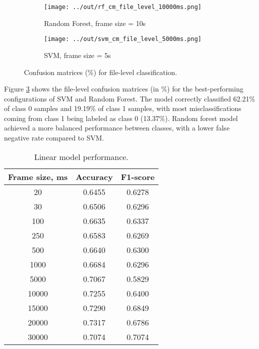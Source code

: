 \documentclass[conference]{IEEEtran}
\begin{document}

\begin{figure}[ht]
    \centering
    \captionsetup{font=small}
    \begin{subfigure}[b]{0.23\textwidth}
        \centering
        \texttt{[image: ../out/rf\_cm\_file\_level\_10000ms.png]}
        \caption{Random Forest, frame size = 10s}
        \label{fig:cm_rf_10s}
    \end{subfigure}
    \hfill
    \begin{subfigure}[b]{0.23\textwidth}
        \centering
        \texttt{[image: ../out/svm\_cm\_file\_level\_5000ms.png]}
        \caption{SVM, frame size = 5s}
        \label{fig:cm_svm_5s}
    \end{subfigure}
    \caption{Confusion matrices (\%) for file-level classification.}
    \label{fig:cm_comparison}
\end{figure}

Figure \ref{fig:cm_comparison} shows the file-level confusion matrices (in \%) for the best-performing configurations of SVM and Random Forest.
The model correctly classified 62.21\% of class 0 samples and 19.19\% of class 1 samples, with most misclassifications coming from class 1 being labeled as class 0 (13.37\%).
Random forest model achieved a more balanced performance between classes, with a lower false negative rate compared to SVM.


\begin{table}[h]
\centering
\caption{Linear model performance.}
\begin{tabular}{|c|c|c|}
\hline
\textbf{Frame size, ms} & \textbf{Accuracy} & \textbf{F1-score}\\
\hline
20 & 0.6455 & 0.6278 \\
\hline
30 & 0.6506 & 0.6296 \\
\hline
100 & 0.6635 & 0.6337 \\
\hline
250 & 0.6583 & 0.6269 \\
\hline
500 & 0.6640 & 0.6300 \\
\hline
1000 & 0.6684 & 0.6296 \\
\hline
5000 & 0.7067 & 0.5829 \\
\hline
10000 & 0.7255 & 0.6400 \\
\hline
15000 & 0.7290 & 0.6849 \\
\hline
20000 & 0.7317 & 0.6786 \\
\hline
30000 & 0.7074 & 0.7074 \\
\hline
\end{tabular}
\label{tab:linear_model_perf}
\end{table}
\end{document}
